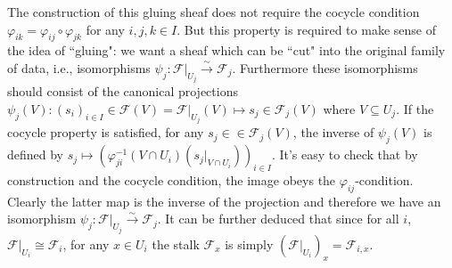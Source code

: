 \documentclass[12pt,letter]{article}
\begin{document}
	The construction of this gluing sheaf does not require the cocycle condition $\varphi_{ik}=\varphi_{ij}\circ\varphi_{jk}$ for any $i,j,k\in I$. But this property is required to make sense of the idea of ``gluing": we want a sheaf which can be ``cut" into the original family of data, i.e., isomorphisms $\psi_j:\mathscr F|_{U_j}\xrightarrow{\sim}\mathscr F_j$. Furthermore these isomorphisms should consist of the canonical projections $\psi_j(V):(s_i)_{i\in I}\in\mathscr F(V)=\mathscr F|_{U_j}(V)\mapsto s_j\in\mathscr F_j(V)$ where $V\subseteq U_j$. If the cocycle property is satisfied, for any $s_j\in \in\mathscr F_j(V)$, the inverse of $\psi_j(V)$ is defined by $s_j\mapsto \left(\varphi_{ji}^{-1}(V\cap U_i)(s_j|_{V\cap U_i})\right)_{i\in I}$. It's easy to check that by construction and the cocycle condition, the image obeys the $\varphi_{ij}$-condition. Clearly the latter map is the inverse of the projection and therefore we have an isomorphism $\psi_j:\mathscr F|_{U_j}\xrightarrow{\sim}\mathscr F_j$. It can be further deduced that since for all $i$, $\mathscr F|_{U_i}\cong\mathscr F_i$, for any $x\in U_i$ the stalk $\mathscr F_x$ is simply $(\mathscr F|_{U_i})_x=\mathscr F_{i, x}$.
	
\end{document}
